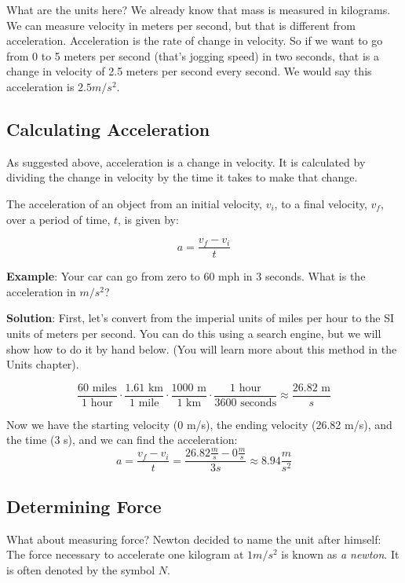 What are the units here? We already know that mass is measured in
kilograms. We can measure velocity in meters per second, but that is
different from acceleration. Acceleration is the rate of change in
velocity. So if we want to go from 0 to 5 meters per second (that's
jogging speed) in two seconds, that is a change in velocity of 2.5
meters per second every second. We would say this acceleration is $2.5
m/s^2$.

\subsection{Calculating Acceleration}
As suggested above, acceleration is a change in velocity. It is calculated by 
dividing the change in velocity by the time it takes to make that change.

\begin{mdframed}[style = important, frametitle = {Calculating Acceleration}]
The acceleration of an object from an initial velocity, $v_i$, to a final 
velocity, $v_f$, over a period of time, $t$, is given by:

$$a = \frac{v_f - v_i}{t}$$
\end{mdframed}

\textbf{Example}: Your car can go from zero to 60 mph in 3 seconds. What is the
acceleration in $m / s^2$?

\textbf{Solution}: First, let's convert from the imperial units of miles per 
hour to the SI units of meters per second. You can do this using a search engine, but we will show how to do it by hand below. (You will learn more about this method in the Units chapter).

$$\frac{60 \text{ miles}}{1 \text{ hour}} \cdot \frac{1.61 \text{ km}}{1 \text{ mile}} \cdot \frac{1000\text{ m}}{1\text{ km}} \cdot \frac{1\text{ hour}}{3600\text{ seconds}} \approx \frac{26.82\text{ m}}{s}$$

Now we have the starting velocity (0 m/s), the ending velocity (26.82 m/s), and the time (3 s), and we can find the acceleration:
$$a = \frac{v_f - v_i}{t} = \frac{26.82\frac{m}{s} - 0\frac{m}{s}}{3s} \approx 8.94 \frac{m}{s^2}$$

\subsection{Determining Force}
What about measuring force? Newton decided to name the unit after himself: The 
force necessary to accelerate one kilogram at $1 m/s^2$ is known as \textit{a 
newton}. It is often denoted by the symbol $N$.


